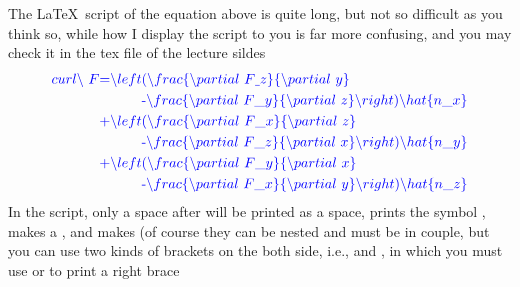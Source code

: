 \begin{frame}
	The \LaTeX\ script of the equation above is quite long, but not so difficult as you think so, while how I display the script to you is far more confusing, and you may check it in the tex file of the lecture sildes
	\begin{align*}
	\color{blue} curl\backslash\ F
	\text{=}\backslash left & \color{blue} (\backslash frac\{\backslash partial\ F\uline{\ }z\}\{\backslash partial\ y\}\\
	& \color{blue} \text{-}\backslash frac\{\backslash partial\ F\_y\}\{\backslash partial\ z\}\backslash right)\backslash hat\{n\_x\}\\
	\color{blue} \text{+}\backslash left & \color{blue} (\backslash frac\{\backslash partial\ F\_x\}\{\backslash partial\ z\}\\
	& \color{blue} \text{-}\backslash frac\{\backslash partial\ F\_z\}\{\backslash partial\ x\}\backslash right)\backslash hat\{n\_y\}\\
	\color{blue} \text{+}\backslash left & \color{blue} (\backslash frac\{\backslash partial\ F\_y\}\{\backslash partial\ x\}\\
	& \color{blue} \text{-}\backslash frac\{\backslash partial\ F\_x\}\{\backslash partial\ y\}\backslash right)\backslash hat\{n\_z\}
	\end{align*}
	In the script, only a space after \structure{\textbackslash} will be printed as a space,  prints the symbol \structure{$\partial$},  makes a ,  and  makes  (of course they can be nested and must be in couple, but you can use two kinds of brackets on the both side, i.e., \structure{\textbackslash left[} and , in which you must use  or \structure{\textbackslash \}} to print a right brace \structure{$\rbrace$} \\
\end{frame}

